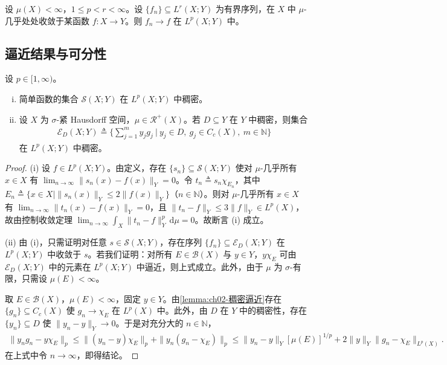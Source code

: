 \documentclass[../../main.tex]{subfiles}%
\begin{document}
\begin{corollary}\label{corollary:ch04-有界收敛}
设 $\mu(X)<\infty$，$1\leqslant p<r<\infty$。设 $\{f_n\}\subseteq L^r(X;Y)$ 为有界序列，在 $X$ 中 $\mu$-几乎处处收敛于某函数 $f:X\to Y$。则 $f_n\to f$ 在 $L^p(X;Y)$ 中。
\end{corollary}

\subsection{逼近结果与可分性}\label{subsection:ch04-逼近可分}

\begin{proposition}\label{proposition:ch04-简单函数稠密}\label{proposition:ch04-稠密}
设 $p\in[1,\infty)$。
\begin{enumerate}[(i)]
\item\label{item:ch04-简单函数稠密-i} 简单函数的集合 $\mathcal{S}(X;Y)$ 在 $L^p(X;Y)$ 中稠密。
\item\label{item:ch04-简单函数稠密-ii} 设 $X$ 为 $\sigma$-紧 Hausdorff 空间，$\mu\in\mathcal{R}^+(X)$。若 $D\subseteq Y$ 在 $Y$ 中稠密，则集合
\begin{align}
\mathcal{E}_D(X;Y)\triangleq \Big\{\sum_{j=1}^m y_jg_j\ \Big|\ y_j\in D,\ g_j\in C_c(X),\ m\in\mathbb{N}\Big\} \label{align:ch04-4.71}
\end{align}
在 $L^p(X;Y)$ 中稠密。
\end{enumerate}
\end{proposition}

\begin{proof}
(i) 设 $f\in L^p(X;Y)$。由定义，存在 $\{s_n\}\subseteq\mathcal{S}(X;Y)$ 使对 $\mu$-几乎所有 $x\in X$ 有 $\lim_{n\to\infty}\|s_n(x)-f(x)\|_Y=0$。令 $t_n\triangleq s_n\chi_{E_n}$，其中 $E_n\triangleq \{x\in X\mid\|s_n(x)\|_Y\leqslant2\|f(x)\|_Y\}$（$n\in\mathbb{N}$）。则对 $\mu$-几乎所有 $x\in X$ 有 $\lim_{n\to\infty}\|t_n(x)-f(x)\|_Y=0$，且 $\|t_n-f\|_Y\leqslant3\|f\|_Y\in L^p(X)$，故由控制收敛定理 $\lim_{n\to\infty}\int_X\|t_n-f\|_Y^p\,\mathrm{d}\mu=0$。故断言 (i) 成立。

(ii) 由 (i)，只需证明对任意 $s\in\mathcal{S}(X;Y)$，存在序列 $\{f_n\}\subseteq\mathcal{E}_D(X;Y)$ 在 $L^p(X;Y)$ 中收敛于 $s$。若我们证明：对所有 $E\in\mathcal{B}(X)$ 与 $y\in Y$，$y\chi_E$ 可由 $\mathcal{E}_D(X;Y)$ 中的元素在 $L^p(X;Y)$ 中逼近，则上式成立。此外，由于 $\mu$ 为 $\sigma$-有限，只需设 $\mu(E)<\infty$。

取 $E\in\mathcal{B}(X)$，$\mu(E)<\infty$，固定 $y\in Y$。由\cref{lemma:ch02-稠密逼近}存在 $\{g_n\}\subseteq C_c(X)$ 使 $g_n\to\chi_E$ 在 $L^p(X)$ 中。此外，由 $D$ 在 $Y$ 中的稠密性，存在 $\{y_n\}\subseteq D$ 使 $\|y_n-y\|_Y\to0$。于是对充分大的 $n\in\mathbb{N}$，
\begin{align*}
\|y_ng_n-y\chi_E\|_p\leqslant\|(y_n-y)\chi_E\|_p+\|y_n(g_n-\chi_E)\|_p
\leqslant\|y_n-y\|_Y[\mu(E)]^{1/p}+2\|y\|_Y\|g_n-\chi_E\|_{L^p(X)}.
\end{align*}
在上式中令 $n\to\infty$，即得结论。
\end{proof}
\end{document}
